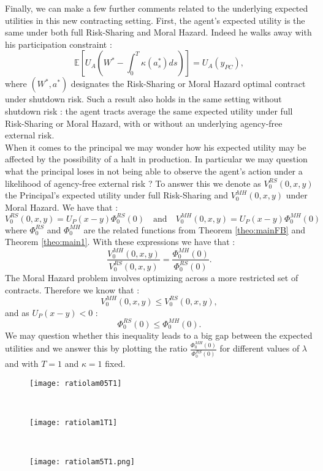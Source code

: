 \documentclass[numbook, envcountsect, envcountsame, envcountreset, runningheads, smallextended]{article}
\def \E{\mathbb{E}}
\begin{document}
Finally, we can make a few further comments related to the underlying expected utilities in this new contracting setting. First, the agent's expected utility is the same under both full Risk-Sharing and Moral Hazard. Indeed he walks away with his participation constraint : 
$$ \E\left[ U_A\left(W^* - \int_0^T \kappa(a^*_s) ds\right) \right] = U_A(y_{PC}),$$
where $(W^*, a^*)$ designates the Risk-Sharing or Moral Hazard optimal contract under shutdown risk. Such a result also holds in the same setting without shutdown risk : the agent tracts average the same expected utility under full Risk-Sharing or Moral Hazard, with or without an underlying agency-free external risk. \\
When it comes to the principal we may wonder how his expected utility may be affected by the possibility of a halt in production. In particular we may question what the principal loses in not being able to observe the agent's action under a likelihood of agency-free external risk ? To answer this we denote as $V_0^{RS}(0,x,y)$ the Principal's expected utility under full Risk-Sharing and $V_0^{MH}(0,x,y)$ under Moral Hazard. We have that : 
$$V_0^{RS}(0,x,y) = U_P(x-y) \Phi_0^{RS}(0) \quad \text{and} \quad V_0^{MH}(0,x,y) = U_P(x-y) \Phi_0^{MH}(0)$$
where $\Phi_0^{RS}$ and $\Phi_0^{MH}$ are the related functions from Theorem \ref{theo:mainFB} and Theorem \ref{theo:main1}. With these expressions we have that : 
$$ \dfrac{ V_0^{MH}(0,x,y) }{V_0^{RS}(0,x,y) } = \frac{ \Phi_0^{MH}(0)}{ \Phi_0^{RS}(0)}.$$
The Moral Hazard problem involves optimizing across a more restricted set of contracts. Therefore we know that : 
$$V_0^{MH}(0,x,y) \leq V_0^{RS}(0,x,y),$$
and as $U_P(x-y)<0$ : 
$$\Phi_0^{RS}(0) \leq \Phi_0^{MH}(0).$$ 
We may question whether this inequality leads to a big gap between the expected utilities and we answer this by plotting the ratio $\frac{\Phi_0^{MH}(0)}{\Phi_0^{RS}(0)}$ for different values of $\lambda$ and with $T=1$ and $\kappa=1$ fixed.

\begin{figure}[htb!]
\centering

\begin{minipage}{0.31\textwidth}
  \centering
  \texttt{[image: ratiolam05T1]}
  \label{fig:test11}
\end{minipage}%
~
~
\begin{minipage}{0.31\textwidth}
  \centering
  \texttt{[image: ratiolam1T1]}
  \label{fig:test12}
\end{minipage}%
~
~
\begin{minipage}{0.31\textwidth}
  \centering
  \texttt{[image: ratiolam5T1.png]}
  \label{fig:test13}
\end{minipage}
\end{figure}
\end{document}
